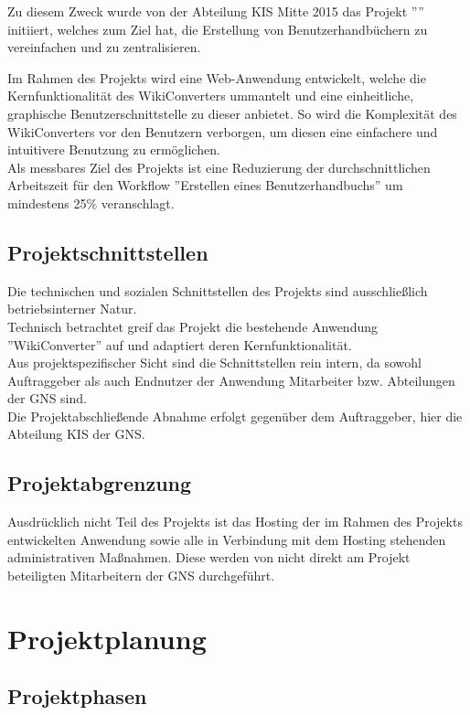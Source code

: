 \documentclass[12pt, xcolor=dvipsnames]{scrartcl}
\begin{document}
Zu diesem Zweck wurde von der Abteilung KIS Mitte 2015 das Projekt ''\Projekt'' initiiert, welches zum Ziel hat, die Erstellung von Benutzerhandbüchern zu vereinfachen und zu zentralisieren.

Im Rahmen des Projekts wird eine Web-Anwendung entwickelt, welche die Kernfunktionalität des WikiConverters ummantelt und eine einheitliche, graphische Benutzerschnittstelle zu dieser anbietet. So wird die Komplexität des WikiConverters vor den Benutzern verborgen, um diesen eine einfachere und intuitivere Benutzung zu ermöglichen. \\

Als messbares Ziel des Projekts ist eine Reduzierung der durchschnittlichen Arbeitszeit für den Workflow ''Erstellen eines Benutzerhandbuchs'' um mindestens 25\% veranschlagt.


\subsection{Projektschnittstellen}

Die technischen und sozialen Schnittstellen des Projekts sind ausschließlich betriebsinterner Natur. \\
Technisch betrachtet greif das Projekt die bestehende Anwendung ''WikiConverter'' auf und adaptiert deren Kernfunktionalität. \\
Aus projektspezifischer Sicht sind die Schnittstellen rein intern, da sowohl Auftraggeber als auch Endnutzer der Anwendung Mitarbeiter bzw. Abteilungen der GNS sind. \\
Die Projektabschließende Abnahme erfolgt gegenüber dem Auftraggeber, hier die Abteilung KIS der GNS.


\subsection{Projektabgrenzung}
\label{sec:projektabgrenzung}

Ausdrücklich nicht Teil des Projekts ist das Hosting der im Rahmen des Projekts entwickelten Anwendung sowie alle in Verbindung mit dem Hosting stehenden administrativen Maßnahmen. Diese werden von nicht direkt am Projekt beteiligten Mitarbeitern der GNS durchgeführt.


\section{Projektplanung}

\subsection{Projektphasen} \label{sec:projektphasen}
\end{document}

